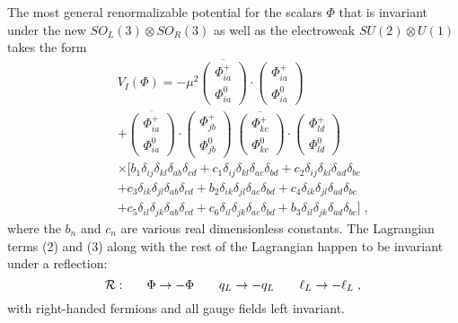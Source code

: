 \documentclass[12pt]{article}
\begin{document}
The most general renormalizable potential for the scalars $\Phi$ that is invariant under  the new $SO_L(3)\otimes  SO_R(3)$ as well as the electroweak $SU(2)\otimes U(1)$ takes the form
\begin{eqnarray}
&&V_I(\Phi)=-\mu^2\overline{\left(\begin{array}{c}\Phi^+_{ia}\\ \Phi^0_{ia}\end{array}\right)}\cdot \left(\begin{array}{c}\Phi^+_{ia}\\ \Phi^0_{ia}\end{array}\right)\nonumber\\&&
+
\overline{\left(\begin{array}{c}\Phi^+_{ia}\\ \Phi^0_{ia}\end{array}\right)}\cdot \left(\begin{array}{c}\Phi^+_{jb}\\ \Phi^0_{jb}\end{array}\right)\;
\overline{\left(\begin{array}{c}\Phi^+_{kc}\\ \Phi^0_{kc}\end{array}\right)}\cdot \left(\begin{array}{c}\Phi^+_{ld}\\ \Phi^0_{ld}\end{array}\right)\nonumber\\&& \times\Bigg[	
b_1\delta_{ij}\delta_{kl}\delta_{ab}\delta_{cd}+c_1\delta_{ij}\delta_{kl}\delta_{ac}\delta_{bd}+c_2\delta_{ij}\delta_{kl}\delta_{ad}\delta_{bc}\nonumber\\&&+c_3\delta_{ik}\delta_{jl}\delta_{ab}\delta_{cd}+b_2\delta_{ik}\delta_{jl}\delta_{ac}\delta_{bd}+c_4\delta_{ik}\delta_{jl}\delta_{ad}\delta_{bc}\nonumber\\&&+c_5\delta_{il}\delta_{jk}\delta_{ab}\delta_{cd}+c_6\delta_{il}\delta_{jk}\delta_{ac}\delta_{bd}+b_3\delta_{il}\delta_{jk}\delta_{ad}\delta_{bc}\Bigg]\;,
\end{eqnarray}
where the $b_n$ and $c_n$ are various real dimensionless constants.
The Lagrangian terms (2) and (3) along with the rest of the Lagrangian happen to be invariant under a reflection:
\begin{equation}
{\cal R}:~~~~~\Phi\rightarrow -\Phi~~~~~~q_L\rightarrow -q_L~~~~~~\ell_L\rightarrow -\ell_L\;,
\end{equation}
with right-handed fermions and all gauge fields left invariant.  
\end{document}

